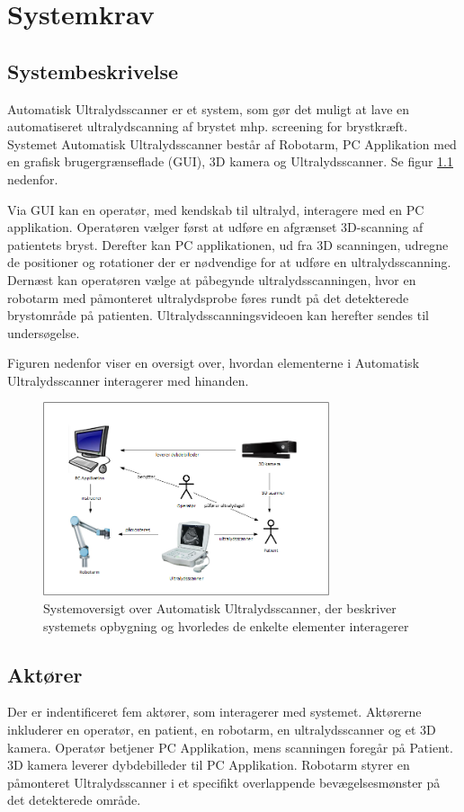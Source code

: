 \chapter{Systemkrav}\label{Systemkrav}
\section{Systembeskrivelse}
Automatisk Ultralydsscanner er et system, som gør det muligt at lave en automatiseret ultralydscanning af brystet mhp. screening for brystkræft. Systemet Automatisk Ultralydsscanner består af Robotarm, PC Applikation med en grafisk brugergrænseflade (GUI), 3D kamera og Ultralydsscanner. Se figur \ref{Systembeskrivelse} nedenfor. 

Via GUI kan en operatør, med kendskab til ultralyd, interagere med en PC applikation. Operatøren vælger først at udføre en afgrænset 3D-scanning af patientets bryst. Derefter kan PC applikationen, ud fra 3D scanningen, udregne de positioner og rotationer der er nødvendige for at udføre en ultralydsscanning. Dernæst kan operatøren vælge at påbegynde ultralydsscanningen, hvor en robotarm med påmonteret ultralydsprobe føres rundt på det detekterede brystområde på patienten. Ultralydsscanningsvideoen kan herefter sendes til undersøgelse.

Figuren nedenfor viser en oversigt over, hvordan elementerne i Automatisk Ultralydsscanner interagerer med hinanden.
 
\begin{figure}[H]
    \centering
    \includegraphics[width=0.75\textwidth]{figurer/d/Kravspecifikation/Systembeskrivelse}
    \caption{Systemoversigt over Automatisk Ultralydsscanner, der beskriver systemets opbygning og hvorledes de enkelte elementer interagerer}
    \label{Systembeskrivelse}
\end{figure}

\section{Aktører}
Der er indentificeret fem aktører, som interagerer med systemet. Aktørerne inkluderer en operatør, en patient, en robotarm, en ultralydsscanner og et 3D kamera. Operatør betjener PC Applikation, mens scanningen foregår på Patient. 3D kamera leverer dybdebilleder til PC Applikation. Robotarm styrer en påmonteret Ultralydsscanner i et specifikt overlappende bevægelsesmønster på det detekterede område.


